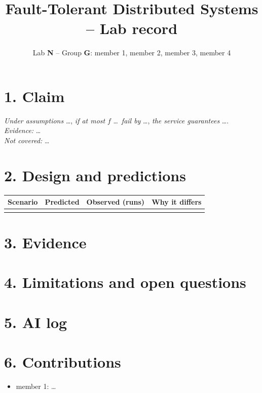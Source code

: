 \documentclass[a4paper,10pt]{article}
\title{Fault-Tolerant Distributed Systems -- Lab record}
\author{Lab \textbf{N} -- Group \textbf{G}: member 1, member 2, member 3, member 4}
\date{}
\begin{document}
\maketitle
\vspace{-3em}

\section*{1. Claim}

\noindent\emph{Under assumptions} \dots, \emph{if at most} $f$ \dots\
\emph{fail by} \dots, \emph{the service guarantees} \dots.\\
\emph{Evidence:} \dots\\
\emph{Not covered:} \dots

\section*{2. Design and predictions}


\begin{center}
\begin{tabular}{@{}llll@{}}
\toprule
Scenario & Predicted & Observed (runs) & Why it differs \\
\midrule
 & & & \\
\bottomrule
\end{tabular}
\end{center}

\section*{3. Evidence}


\section*{4. Limitations and open questions}

\section*{5. AI log}


\section*{6. Contributions}

\begin{itemize}
\item member 1: \dots
\end{itemize}
\end{document}
